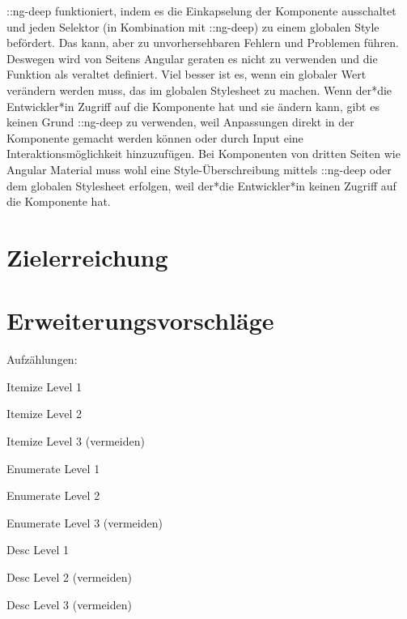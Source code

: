 ::ng-deep funktioniert, indem es die Einkapselung der Komponente ausschaltet und jeden Selektor (in Kombination mit ::ng-deep) zu einem globalen Style befördert. Das kann, aber zu unvorhersehbaren Fehlern und Problemen führen. Deswegen wird von Seitens Angular geraten es nicht zu verwenden und die Funktion als veraltet definiert. Viel besser ist es, wenn ein globaler Wert verändern werden muss, das im globalen Stylesheet zu machen.
Wenn der*die Entwickler*in Zugriff auf die Komponente hat und sie ändern kann, gibt es keinen Grund ::ng-deep zu verwenden, weil Anpassungen direkt in der Komponente gemacht werden können oder durch Input eine Interaktionsmöglichkeit hinzuzufügen. Bei Komponenten von dritten Seiten wie Angular Material muss wohl eine Style-Überschreibung mittels ::ng-deep oder dem globalen Stylesheet erfolgen, weil der*die Entwickler*in keinen Zugriff auf die Komponente hat.
\cite{AngularComponentsStyleNgDEEP}
\cite{UnderstandingNgDeep}

\section{Zielerreichung}
\section{Erweiterungsvorschläge}


Aufzählungen:

\begin{compactitem}
    \item Itemize Level 1
    \begin{compactitem}
        \item Itemize Level 2
        \begin{compactitem}
            \item Itemize Level 3 (vermeiden)
        \end{compactitem}
    \end{compactitem}
\end{compactitem}

\begin{compactenum}
    \item Enumerate Level 1
    \begin{compactenum}
        \item Enumerate Level 2
        \begin{compactenum}
            \item Enumerate Level 3 (vermeiden)
        \end{compactenum}
    \end{compactenum}
\end{compactenum}

\begin{compactdesc}
    \item[Desc] Level 1
    \begin{compactdesc}
        \item[Desc] Level 2 (vermeiden)
        \begin{compactdesc}
            \item[Desc] Level 3 (vermeiden)
        \end{compactdesc}
    \end{compactdesc}
\end{compactdesc}

